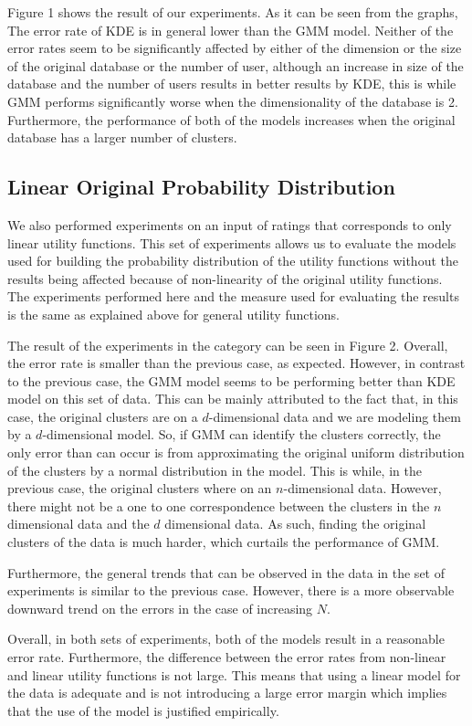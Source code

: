 Figure 1 shows the result of our experiments. As it can be seen from the graphs, The error rate of KDE is in general lower than the GMM model. Neither of the error rates seem to be significantly affected by either of the dimension or the size of the original database or the number of user, although an increase in size of the database and the number of users results in better results by KDE, this is while GMM performs significantly worse when the dimensionality of the database is 2. Furthermore, the performance of both of the models increases when the original database has a larger number of clusters.

\subsection{Linear Original Probability Distribution}
We also performed experiments on an input of ratings that corresponds to only linear utility functions. This set of experiments allows us to evaluate the models used for building the probability distribution of the utility functions without the results being affected because of non-linearity of the original utility functions. The experiments performed here and the measure used for evaluating the results is the same  as explained above for general utility functions.

The result of the experiments in the category can be seen in Figure 2. Overall, the error rate is smaller than the previous case, as expected. However, in contrast to the previous case, the GMM model seems to be performing better than KDE model on this set of data. This can be mainly attributed to the fact that, in this case, the original clusters are on a $d$-dimensional data and we are modeling them by a $d$-dimensional model. So, if GMM can identify the clusters correctly, the only error than can occur is from approximating the original uniform distribution of the clusters by a normal distribution in the model. This is while, in the previous case, the original clusters where on an $n$-dimensional data. However, there might not be a one to one correspondence between the clusters in the $n$ dimensional data and the $d$ dimensional data. As such, finding the original clusters of the data is much harder, which curtails the performance of GMM.

Furthermore, the general trends that can be observed in the data in the set of experiments is similar to the previous case. However, there is a more observable downward trend on the errors in the case of increasing $N$.

Overall, in both sets of experiments, both of the models result in a reasonable error rate. Furthermore, the difference between the error rates from non-linear and linear utility functions is not large. This means that using a linear model for the data is adequate and is not introducing a large error margin which implies that the use of the model is justified empirically. 





